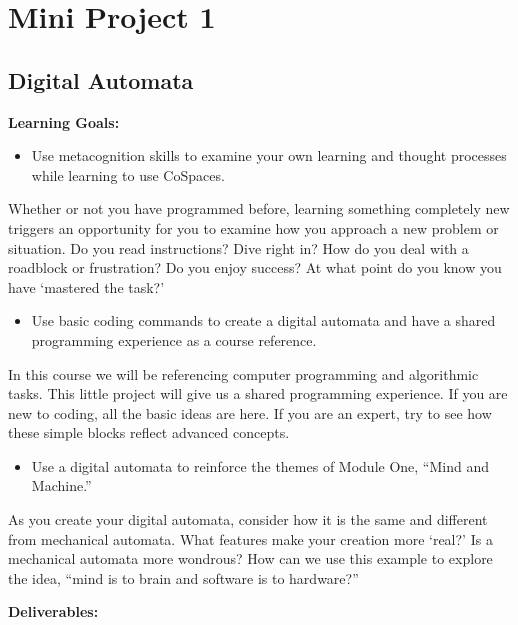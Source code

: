 \clearpage
\chapter{Mini Project 1}

\section{Digital Automata}

\textbf{Learning Goals:}

\begin{itemize}
    \item Use metacognition skills to examine your own learning and thought processes while learning to use CoSpaces.
\end{itemize}

Whether or not you have programmed before, learning something completely new triggers an opportunity for you to examine how you approach a new problem or situation. Do you read instructions? Dive right 
in? How do you deal with a roadblock or frustration? Do you enjoy success? At what point do you know you have ‘mastered the task?’

\begin{itemize}
    \item Use basic coding commands to create a digital automata and have a shared programming experience as a course reference.
\end{itemize}

In this course we will be referencing computer programming and algorithmic tasks. This little project will give us a shared programming experience. If you are new to coding, all the basic ideas are here. 
If you are an expert, try to see how these simple blocks reflect advanced concepts.

\begin{itemize}
    \item Use a digital automata to reinforce the themes of Module One, “Mind and Machine.”
\end{itemize}

As you create your digital automata, consider how it is the same and different from mechanical automata. What features make your creation more ‘real?’ Is a mechanical automata more wondrous? How can we use 
this example to explore the idea, “mind is to brain and software is to hardware?” \vspace*{1em}

\textbf{Deliverables:}

